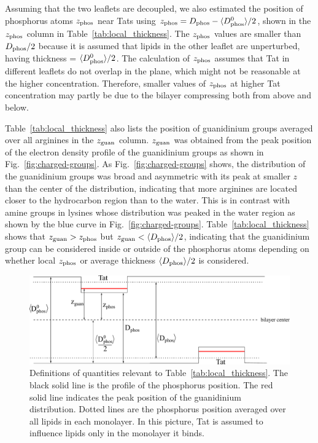 Assuming that the two leaflets are decoupled, we also estimated the position
of phosphorus atoms $z_\textrm{phos}$ near Tats 
using $z_\textrm{phos} = D_\text{phos} - \langle D_\text{phos}^0\rangle/2$, shown in the $z_\textrm{phos}$ column
in Table~\ref{tab:local_thickness}. 
The $z_\textrm{phos}$ values are smaller than $D_\text{phos} /2$
because it is assumed that lipids in the other leaflet are unperturbed,
having thickness = $\langle D_\text{phos}^0\rangle/2$.
The calculation of $z_\textrm{phos}$ assumes that Tat in different leaflets do not
overlap in the plane, which might not be reasonable at the higher concentration.
Therefore, smaller values of $z_\textrm{phos}$ at higher Tat concentration
may partly be due to the bilayer compressing both from above and below.

Table~\ref{tab:local_thickness} also lists
the position of guanidinium groups averaged
over all arginines in the $z_\textrm{guan}$ column. $z_\textrm{guan}$ was obtained
from the peak position of the electron density profile of the guanidinium groups 
as shown in Fig.~\ref{fig:charged-groups}. As Fig.~\ref{fig:charged-groups} shows,
the distribution of the guanidinium groups was broad and 
asymmetric with its peak at smaller $z$ than the center
of the distribution, indicating that more arginines are located closer to the
hydrocarbon region than to the water. This is in contrast with amine groups
in lysines whose distribution was peaked in the water region as shown by
the blue curve in Fig.~\ref{fig:charged-groups}.
Table~\ref{tab:local_thickness} shows that $z_\textrm{guan} > z_\textrm{phos}$ but
$z_\textrm{guan} < \langle D_\text{phos}\rangle/2$, indicating that the guanidinium group 
can be considered inside or outside of the phosphorus atoms depending on
whether local $z_\textrm{phos}$ or average thickness $\langle D_\text{phos}\rangle/2$ is considered.

\begin{figure}[htbp]
  \centering
  \includegraphics[width=\textwidth]{figures/Tat/MD_Results/dimensions}
  \caption[Definitions of quantities relevant to Table~\ref{tab:local_thickness}]
  {Definitions of quantities relevant to Table~\ref{tab:local_thickness}.
  The black solid line is the profile of the phosphorus position.
  The red solid line indicates the peak position of the guanidinium 
  distribution. Dotted lines are the phosphorus position averaged over all
  lipids in each monolayer. In this picture, Tat is assumed to influence
  lipids only in the monolayer it binds.}
  \label{fig:Dphos_dimensions}
\end{figure} 

